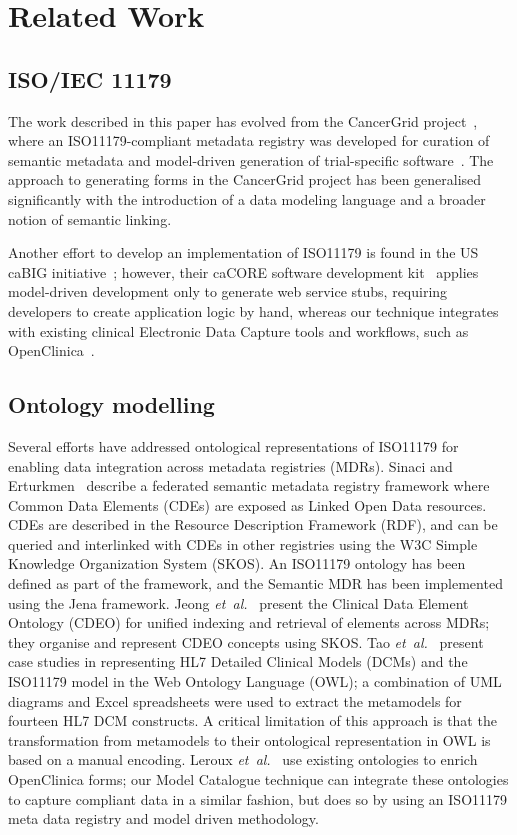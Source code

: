 
\section{Related Work}

\subsection{ISO/IEC 11179}

The work described in this paper has evolved from the CancerGrid
project~\cite{davi14}, where an ISO11179-compliant metadata registry
was developed for curation of semantic metadata and model-driven
generation of trial-specific software~\cite{davi12, Abler2011}.  The
approach to generating forms in the CancerGrid project has been
generalised significantly with the introduction of a data modeling
language and a broader notion of semantic linking. 

Another effort to develop an implementation of ISO11179 is found in
the US caBIG initiative~\cite{kunz09}; however, their caCORE software
development kit~\cite{koma08} applies model-driven development only to
generate web service stubs, requiring developers to create application
logic by hand, whereas our technique integrates with existing clinical
Electronic Data Capture tools and workflows, such as
OpenClinica~\cite{oc}.

\subsection{Ontology modelling}


Several efforts have addressed ontological representations of ISO11179 
for enabling data integration across metadata
registries (MDRs). Sinaci and Erturkmen~\cite{Sinaci2013784} describe a
federated semantic metadata registry framework where Common Data
Elements (CDEs) are exposed as Linked Open Data resources. CDEs are
described in the Resource Description Framework (RDF), and can be queried and interlinked with CDEs in other
registries using the W3C Simple Knowledge Organization System (SKOS). 
An ISO11179 ontology has been defined as part of
the framework, and the Semantic MDR has been implemented using the Jena
framework. 
Jeong \textit{et~al.}~\cite{pmid25405066} present the Clinical
Data Element Ontology (CDEO) for unified indexing and retrieval of
elements across MDRs; they organise and
represent CDEO concepts using SKOS. 
Tao \textit{et~al.}~\cite{pmid22211181} present
case studies in representing HL7 Detailed Clinical Models (DCMs) and
the ISO11179 model in the Web Ontology Language (OWL);
a combination of UML diagrams and Excel
spreadsheets were used to extract the metamodels for fourteen HL7 DCM
constructs. A critical limitation of this approach is that the
transformation from metamodels to their ontological representation in
OWL is based on a manual encoding. 
Leroux \textit{et~al.}~\cite{lero12} use existing
ontologies to enrich OpenClinica forms; our Model Catalogue
technique can integrate these ontologies to capture compliant data in
a similar fashion, but does so by using an ISO11179 meta data registry
and model driven methodology.

